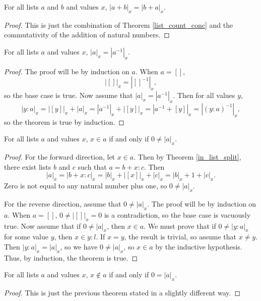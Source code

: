 \documentclass[../../math.tex]{subfiles}
\begin{document}
\begin{theorem} \label{list_count_comm}
    For all lists $a$ and $b$ and values $x$, $|a + b|_x = |b + a|_x$.
\end{theorem}
\begin{proof}
    This is just the combination of Theorem \ref{list_count_conc} and the
    commutativity of the addition of natural numbers.
\end{proof}

\begin{theorem} \label{list_count_reverse}
    For all lists $a$ and values $x$, $|a|_x = |a^{-1}|_x$.
\end{theorem}
\begin{proof}
    The proof will be by induction on $a$.  When $a = []$,
    \[
        |[]|_x = |[]^{-1}|_x,
    \]
    so the base case is true.  Now assume that $|a|_x = |a^{-1}|_x$.  Then for
    all values $y$,
    \[
        |y : a|_x = |[y]|_x + |a|_x = |a^{-1}|_x + |[y]|_x = |a^{-1} + [y]|_x
        = |(y : a)^{-1}|_x,
    \]
    so the theorem is true by induction.
\end{proof}

\begin{theorem} \label{list_count_in}
    For all lists $a$ and values $x$, $x \in a$ if and only if $0 \neq |a|_x$.
\end{theorem}
\begin{proof}
    For the forward direction, let $x \in a$.  Then by Theorem
    \ref{in_list_split}, there exist lists $b$ and $c$ such that $a = b + x :
    c$.  Then
    \[
        |a|_x = |b + x : c|_x = |b|_x + |[x]|_x + |c|_x = |b|_x + 1 + |c|_x.
    \]
    Zero is not equal to any natural number plus one, so $0 \neq |a|_x$.

    For the reverse direction, assume that $0 \neq |a|_x$.  The proof will be by
    induction on $a$.  When $a = []$, $0 \neq |[]|_x = 0$ is a contradiction, so
    the base case is vacuously true.  Now assume that if $0 \neq |a|_x$, then $x
    \in a$.  We must prove that if $0 \neq |y : a|_x$ for some value $y$, then
    $x \in y : l$.  If $x = y$, the result is trivial, so assume that $x \neq
    y$.  Then $|y : a|_x = |a|_x$, so we have $0 \neq |a|_x$, so $x \in a$ by
    the inductive hypothesis.  Thus, by induction, the theorem is true.
\end{proof}

\begin{theorem} \label{list_count_nin}
    For all lists $a$ and values $x$, $x \notin a$ if and only if $0 = |a|_x$.
\end{theorem}
\begin{proof}
    This is just the previous theorem stated in a slightly different way.
\end{proof}
\end{document}
